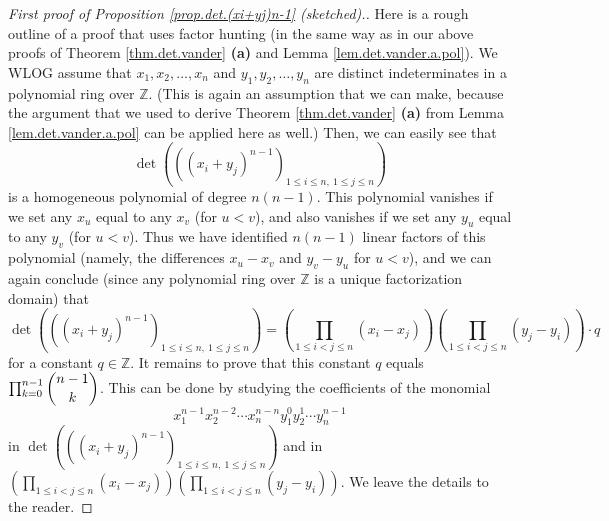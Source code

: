 \begin{proof}
[First proof of Proposition \ref{prop.det.(xi+yj)n-1} (sketched).]Here is a
rough outline of a proof that uses factor hunting (in the same way as in our
above proofs of Theorem \ref{thm.det.vander} \textbf{(a)} and Lemma
\ref{lem.det.vander.a.pol}). We WLOG assume that $x_{1},x_{2},\ldots,x_{n}$
and $y_{1},y_{2},\ldots,y_{n}$ are distinct indeterminates in a polynomial
ring over $\mathbb{Z}$. (This is again an assumption that we can make, because
the argument that we used to derive Theorem \ref{thm.det.vander} \textbf{(a)}
from Lemma \ref{lem.det.vander.a.pol} can be applied here as well.) Then, we
can easily see that%
\[
\det\left(  \left(  \left(  x_{i}+y_{j}\right)  ^{n-1}\right)  _{1\leq i\leq
n,\ 1\leq j\leq n}\right)
\]
is a homogeneous polynomial of degree $n\left(  n-1\right)  $. This polynomial
vanishes if we set any $x_{u}$ equal to any $x_{v}$ (for $u<v$), and also
vanishes if we set any $y_{u}$ equal to any $y_{v}$ (for $u<v$). Thus we have
identified $n\left(  n-1\right)  $ linear factors of this polynomial (namely,
the differences $x_{u}-x_{v}$ and $y_{v}-y_{u}$ for $u<v$), and we can again
conclude (since any polynomial ring over $\mathbb{Z}$ is a unique
factorization domain) that
\[
\det\left(  \left(  \left(  x_{i}+y_{j}\right)  ^{n-1}\right)  _{1\leq i\leq
n,\ 1\leq j\leq n}\right)  =\left(  \prod_{1\leq i<j\leq n}\left(  x_{i}%
-x_{j}\right)  \right)  \left(  \prod_{1\leq i<j\leq n}\left(  y_{j}%
-y_{i}\right)  \right)  \cdot q
\]
for a constant $q\in\mathbb{Z}$. It remains to prove that this constant $q$
equals $\prod_{k=0}^{n-1}\dbinom{n-1}{k}$. This can be done by studying the
coefficients of the monomial%
\[
x_{1}^{n-1}x_{2}^{n-2}\cdots x_{n}^{n-n}y_{1}^{0}y_{2}^{1}\cdots y_{n}^{n-1}%
\]
in $\det\left(  \left(  \left(  x_{i}+y_{j}\right)  ^{n-1}\right)  _{1\leq
i\leq n,\ 1\leq j\leq n}\right)  $ and in $\left(  \prod_{1\leq i<j\leq
n}\left(  x_{i}-x_{j}\right)  \right)  \left(  \prod_{1\leq i<j\leq n}\left(
y_{j}-y_{i}\right)  \right)  $. We leave the details to the reader.
\end{proof}

